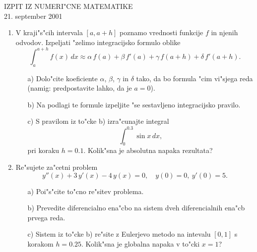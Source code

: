 
\begin{center}
  IZPIT IZ NUMERI"CNE MATEMATIKE\\
  21. september 2001
\end{center}

\vspace{1.5cm}
\begin{enumerate}
 \item V kraji"s"cih intervala $[a,a+h]$ poznamo vrednosti 
    funkcije $f$ in njenih odvodov. Izpeljati "zelimo 
    integracijsko formulo oblike
    $$\int_{a}^{a+h} f(x)\,dx\approx \alpha\,f(a)+
    \beta\,f'(a)+\gamma\,f(a+h)+\delta\,f'(a+h).$$
  \begin{itemize}
    \item[a)] Dolo"cite koeficiente $\alpha$, $\beta$, $\gamma$
      in $\delta$ tako, da bo formula "cim vi"sjega reda (namig:
      predpostavite lahko, da je $a=0$).
    \item[b)] Na podlagi te formule izpeljite "se 
      sestavljeno integracijsko pravilo.
    \item[c)] S pravilom iz to"cke b) izra"cunajte integral
      $$\int_{0}^{0.3} \sin{x}\,dx,$$
      pri koraku $h=0.1$. Kolik"sna je absolutna napaka rezultata?
  \end{itemize}

 \item Re"sujete za"cetni problem
    $$y''(x)+3\,y'(x)-4\,y(x)=0,\quad y(0)=0,\ y'(0)=5.$$
  \begin{itemize}
     \item[a)] Poi"s"cite to"cno re"sitev problema.
     \item[b)] Prevedite diferencialno ena"cbo na sistem dveh
       diferencialnih ena"cb prvega reda.
     \item[c)] Sistem iz to"cke b) re"site z Eulerjevo metodo
       na intevalu $[0,1]$ s korakom $h=0.25$. Kolik"sna je
       globalna napaka v to"cki $x=1$?
     \end{itemize}
\end{enumerate}
